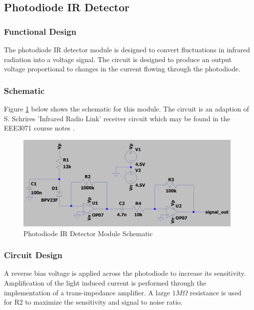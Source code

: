 



\subsection{Photodiode IR Detector}

\subsubsection{Functional Design}
The photodiode IR detector module is designed to convert fluctuations in infrared radiation into a voltage signal. The circuit is designed to produce an output voltage proportional to changes in the current flowing through the photodiode.


\subsubsection{Schematic}
Figure \ref{fig:schematic_photodiode_transimpedance} below shows the schematic for this module. The circuit is an adaption of S. Schrires 'Infrared Radio Link' receiver circuit which may be found in the EEE3071 course notes \cite{Schrire2007}.

\begin{figure}[H]
	\centering
	\includegraphics[width=.8\textwidth]{figures/design/photodiode_transimpedance.JPG}
	\caption{Photodiode IR Detector Module Schematic}
	\label{fig:schematic_photodiode_transimpedance}
\end{figure}

\subsubsection{Circuit Design}
A reverse bias voltage is applied across the photodiode to increase its sensitivity. Amplification of the light induced current is performed through the implementation of a trans-impedance amplifier. A large $1M\Omega$ resistance is used for R2 to maximize the sensitivity and signal to noise ratio.

